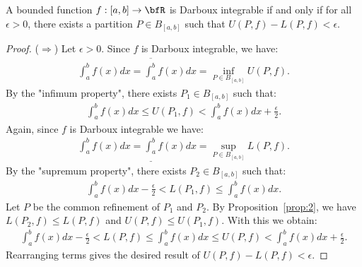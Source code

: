 \documentclass[10pt,twoside,openany]{memoir}
\begin{document}
    \begin{theorem}
        A bounded function $f:[a,b] \rightarrow \bfR$ is Darboux integrable if and only if for all $\epsilon > 0$, there exists a partition $P \in B_{[a,b]}$ such that $U(P,f) - L(P,f) < \epsilon$.
    \end{theorem}
        \begin{proof}
            ($\Rightarrow$) Let $\epsilon > 0$. Since $f$ is Darboux integrable, we have:
                \begin{equation*}
                \begin{split}
                    \int_a^b f(x)dx = \overline{\int_a^b}f(x)dx = \inf_{P \in B_{[a,b]}}U(P,f).
                \end{split}
                \end{equation*}
            By the "infimum property", there exists $P_1 \in B_{[a,b]}$ such that:
                \begin{equation*}
                \begin{split}
                    \int_a^b f(x)dx \leq U(P_1,f) < \int_a^b f(x)dx + \frac{\epsilon}{2}.
                \end{split}
                \end{equation*}
            Again, since $f$ is Darboux integrable we have:
                \begin{equation*}
                \begin{split}
                    \int_a^b f(x)dx = \underline{\int_a^b}f(x)dx = \sup_{P \in B_{[a,b]}}L(P,f).
                \end{split}
                \end{equation*}
            By the "supremum property", there exists $P_2 \in B_{[a,b]}$ such that:
                \begin{equation*}
                \begin{split}
                    \int_a^b f(x)dx - \frac{\epsilon}{2} < L(P_1,f) \leq \int_a^b f(x)dx .
                \end{split}
                \end{equation*}
            Let $P$ be the common refinement of $P_1$ and $P_2$. By Proposition~\ref{prop:2}, we have $L(P_2,f) \leq L(P,f)$ and $U(P,f) \leq U(P_1,f)$. With this we obtain:
                \begin{equation*}
                \begin{split}
                    \int_a^b f(x)dx - \frac{\epsilon}{2} < L(P,f) \leq \int_a^b f(x)dx \leq U(P,f) < \int_a^b f(x)dx + \frac{\epsilon}{2}.
                \end{split}
                \end{equation*}
            Rearranging terms gives the desired result of $U(P,f) - L(P,f) < \epsilon$.


\end{proof}
\end{document}

